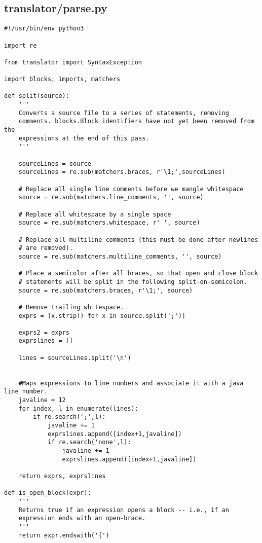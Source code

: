 \subsection*{translator/parse.py}
\begin{lstlisting}
#!/usr/bin/env python3

import re

from translator import SyntaxException

import blocks, imports, matchers

def split(source):
    '''
    Converts a source file to a series of statements, removing
    comments. blocks.Block identifiers have not yet been removed from the
    expressions at the end of this pass.
    '''
      
    sourceLines = source
    sourceLines = re.sub(matchers.braces, r'\1;',sourceLines)

    # Replace all single line comments before we mangle whitespace
    source = re.sub(matchers.line_comments, '', source)

    # Replace all whitespace by a single space
    source = re.sub(matchers.whitespace, r' ', source)

    # Replace all multiline comments (this must be done after newlines
    # are removed).
    source = re.sub(matchers.multiline_comments, '', source)

    # Place a semicolor after all braces, so that open and close block
    # statements will be split in the following split-on-semicolon.
    source = re.sub(matchers.braces, r'\1;', source)

    # Remove trailing whitespace.
    exprs = [x.strip() for x in source.split(';')]

    exprs2 = exprs
    exprslines = []
    
    lines = sourceLines.split('\n')
    

    #Maps expressions to line numbers and associate it with a java line number.
    javaline = 12
    for index, l in enumerate(lines):
        if re.search(';',l):
            javaline += 1
            exprslines.append([index+1,javaline])
            if re.search('none',l):
                javaline += 1
                exprslines.append([index+1,javaline])

    return exprs, exprslines

def is_open_block(expr):
    '''
    Returns true if an expression opens a block -- i.e., if an
    expression ends with an open-brace.
    '''
    return expr.endswith('{')


\end{lstlisting}
